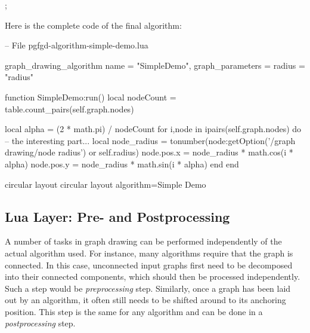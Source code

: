 \begin{codeexample}[]
\tikz {};
\end{codeexample}

Here is the complete code of the final algorithm:
\begin{codeexample}
-- File pgfgd-algorithm-simple-demo.lua

graph_drawing_algorithm {
  name = "SimpleDemo",
  graph_parameters = {
    radius = "radius"
  }
}

function SimpleDemo:run()
   local nodeCount = table.count_pairs(self.graph.nodes)

   local alpha = (2 * math.pi) / nodeCount
   for i,node in ipairs(self.graph.nodes) do
      -- the interesting part...
      local node_radius = tonumber(node:getOption('/graph drawing/node radius')
                                   or self.radius)
      node.pos.x = node_radius * math.cos(i * alpha)
      node.pos.y = node_radius * math.sin(i * alpha)
   end
end
\end{codeexample}

\begin{codeexample}
  
\pgfgddeclarealgorithmkey
  {circular layout}
  {circular layout}
  {algorithm=Simple Demo}

\end{codeexample}




\subsection{Lua Layer: Pre- and Postprocessing}

A number of tasks in graph drawing can be performed independently of
the actual algorithm used. For instance, many algorithms require that
the graph is connected. In this case, unconnected input graphs first
need to be decomposed into their connected components, which should
then be processed independently. Such a step would be
\emph{preprocessing} step. Similarly, once a graph has been laid out
by an algorithm, it often still needs to be shifted around to its
anchoring position. This step is the same for any algorithm and can be
done in a \emph{postprocessing} step.

